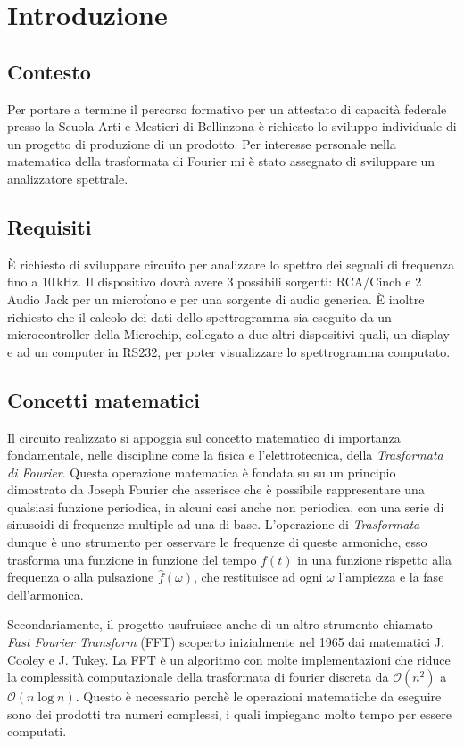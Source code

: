 \chapter{Introduzione}

\section{Contesto}
Per portare a termine il percorso formativo per un attestato di capacit\`a
federale presso la Scuola Arti e Mestieri di Bellinzona \`e richiesto lo
sviluppo individuale di un progetto di produzione di un prodotto.
Per interesse personale nella matematica della trasformata di Fourier mi \`e
stato assegnato di sviluppare un analizzatore spettrale.

\section{Requisiti}
\`E richiesto di sviluppare circuito per analizzare lo spettro dei segnali di
frequenza fino a 10\,kHz. Il dispositivo dovr\`a avere 3 possibili sorgenti:
RCA/Cinch e 2 Audio Jack per un microfono e per una sorgente di audio
generica. \`E inoltre richiesto che il calcolo dei dati dello spettrogramma
sia eseguito da un microcontroller della Microchip, collegato a due
altri dispositivi quali, un display e ad un computer in RS232, per poter
visualizzare lo spettrogramma computato.

\section{Concetti matematici}
Il circuito realizzato si appoggia sul concetto matematico di importanza
fondamentale, nelle discipline come la fisica e l'elettrotecnica, della
\emph{Trasformata di Fourier}. Questa operazione matematica \`e fondata su su
un principio dimostrato da Joseph Fourier che asserisce che \`e possibile
rappresentare una qualsiasi funzione periodica, in alcuni casi anche non
periodica, con una serie di sinusoidi di frequenze multiple ad una di base.
L'operazione di \emph{Trasformata} dunque \`e uno strumento per osservare
le frequenze di queste armoniche, esso trasforma una funzione in funzione del
tempo \(f(t)\) in una funzione rispetto alla frequenza o alla pulsazione
\(\hat f(\omega)\), che restituisce ad ogni \(\omega\) l'ampiezza e la fase
dell'armonica.

Secondariamente, il progetto usufruisce anche di un altro strumento chiamato
\emph{Fast Fourier Transform} (FFT) scoperto inizialmente nel 1965 dai
matematici J. Cooley e J. Tukey. La FFT \`e un algoritmo con molte
implementazioni che riduce la complessit\`a computazionale della trasformata
di fourier discreta da \(\mathcal{O}(n^2)\) a \(\mathcal{O}(n \log n)\).
Questo \`e necessario perch\`e le operazioni matematiche da eseguire sono dei
prodotti tra numeri complessi, i quali impiegano molto tempo per essere
computati.

